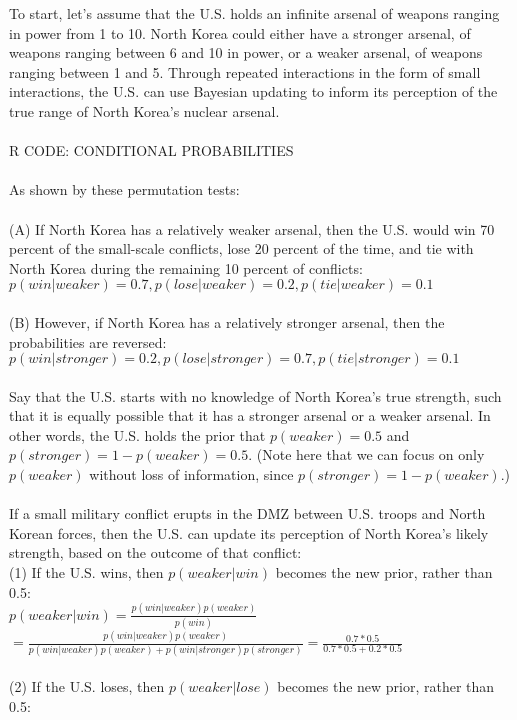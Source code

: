 \documentclass[12pt]{article}
\begin{document}
\begin{itemize}
To start, let's assume that the U.S. holds an infinite arsenal of weapons ranging in power from 1 to 10. North Korea could either have a stronger arsenal, of weapons ranging between 6 and 10 in power, or a weaker arsenal, of weapons ranging between 1 and 5. Through repeated interactions in the form of small interactions, the U.S. can use Bayesian updating to inform its perception of the true range of North Korea's nuclear arsenal.\\
\\
R CODE: CONDITIONAL PROBABILITIES\\
\\
As shown by these permutation tests:\\
\\
(A) If North Korea has a relatively weaker arsenal, then the U.S. would win 70 percent of the small-scale conflicts, lose 20 percent of the time, and tie with North Korea during the remaining 10 percent of conflicts: $p(win | weaker) = 0.7, p(lose | weaker) = 0.2, p(tie | weaker) = 0.1$\\
\\
(B) However, if North Korea has a relatively stronger arsenal, then the probabilities are reversed: $p(win | stronger) = 0.2, p(lose | stronger) = 0.7, p(tie | stronger) = 0.1$\\
\\
Say that the U.S. starts with no knowledge of North Korea's true strength, such that it is equally possible that it has a stronger arsenal or a weaker arsenal. In other words, the U.S. holds the prior that $p(weaker)=0.5$ and $p(stronger)=1-p(weaker)=0.5$. (Note here that we can focus on only  $p(weaker)$ without loss of information, since $p(stronger)=1-p(weaker)$.)\\
\\
If a small military conflict erupts in the DMZ between U.S. troops and North Korean forces, then the U.S. can update its perception of North Korea's likely strength, based on the outcome of that conflict:\\
(1) If the U.S. wins, then $p(weaker | win)$ becomes the new prior, rather than 0.5:\\
$p(weaker | win)= \frac{p(win | weaker) p(weaker)}{p(win)}$\\
$= \frac{p(win | weaker) p(weaker)}{p(win|weaker)p(weaker)+p(win|stronger)p(stronger)} = \frac{0.7*0.5}{0.7*0.5+0.2*0.5}$\\
\\
(2) If the U.S. loses, then $p(weaker | lose)$ becomes the new prior, rather than 0.5:\\

\end{itemize}
\end{document}

